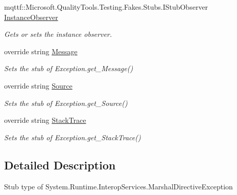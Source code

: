 \begin{DoxyCompactItemize}
mqttf\-::\-Microsoft.\-Quality\-Tools.\-Testing.\-Fakes.\-Stubs.\-I\-Stub\-Observer \hyperlink{class_system_1_1_runtime_1_1_interop_services_1_1_fakes_1_1_stub_marshal_directive_exception_ae0b37ec9f0ee608c591cf6e3c3f53910}{Instance\-Observer}
\begin{DoxyCompactList}\small\item\em Gets or sets the instance observer.\end{DoxyCompactList}\item 
override string \hyperlink{class_system_1_1_runtime_1_1_interop_services_1_1_fakes_1_1_stub_marshal_directive_exception_a328fa85650d58c49793c535f68df4063}{Message}
\begin{DoxyCompactList}\small\item\em Sets the stub of Exception.\-get\-\_\-\-Message()\end{DoxyCompactList}\item 
override string \hyperlink{class_system_1_1_runtime_1_1_interop_services_1_1_fakes_1_1_stub_marshal_directive_exception_a945cb6c94611a862a0fc8e7733acff55}{Source}
\begin{DoxyCompactList}\small\item\em Sets the stub of Exception.\-get\-\_\-\-Source()\end{DoxyCompactList}\item 
override string \hyperlink{class_system_1_1_runtime_1_1_interop_services_1_1_fakes_1_1_stub_marshal_directive_exception_a7a773f7ff40088f0f835966dd7798e4d}{Stack\-Trace}
\begin{DoxyCompactList}\small\item\em Sets the stub of Exception.\-get\-\_\-\-Stack\-Trace()\end{DoxyCompactList}\end{DoxyCompactItemize}


\subsection{Detailed Description}
Stub type of System.\-Runtime.\-Interop\-Services.\-Marshal\-Directive\-Exception



